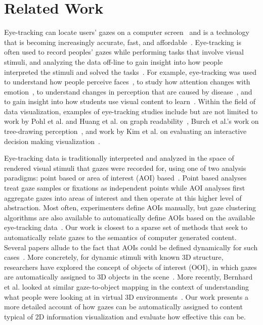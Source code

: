 \section{Related Work}
Eye-tracking can locate users' gazes on a computer screen~\cite{ware1987evaluation, jacob1991use} and is a technology that is becoming increasingly accurate, fast, and affordable~\cite{duchowski2007eye, sesma2012evaluation}. Eye-tracking is often used to record peoples' gazes while performing tasks that involve visual stimuli, and analyzing the data off-line to gain insight into how people interpreted the stimuli and solved the tasks~\cite{duchowski2007eye}. For example, eye-tracking was used to understand how people perceive faces~\cite{guo2014perceiving,shasteen2014eye}, to study how attention changes with emotion~\cite{vervoort2013attentional}, to understand changes in perception that are caused by disease~\cite{kim2014investigating}, and to gain insight into how students use visual content to learn~\cite{zawoyski2014using,mayer2010unique,van2010eye,conati2013eye}. Within the field of data visualization, examples of eye-tracking studies include but are not limited to work by Pohl et al. and Huang et al. on graph readability~\cite{pohl2009comparing,huang2008beyond,huang2005people}, Burch et al.'s work on tree-drawing perception~\cite{burch2011evaluation,burch2013visual}, and work by Kim et al. on evaluating an interactive decision making visualization~\cite{kim2012does}.
 
Eye-tracking data is traditionally interpreted and analyzed in the space of rendered visual stimuli that gazes were recorded for, using one of two analysis paradigms: point based or area of interest (AOI) based~\cite{blascheckstate}. Point based analyses treat gaze samples or fixations as independent points while AOI analyses first aggregate gazes into areas of interest and then operate at this higher level of abstraction. Most often, experimenters define AOIs manually, but gaze clustering algorithms are also available to automatically define AOIs based on the available eye-tracking data~\cite{privitera2000algorithms,santella2004robust,drusch2014analysing}. 
Our work is closest to a sparse set of methods that seek to automatically relate gazes to the semantics of computer generated content. Several papers allude to the fact that AOIs could be defined dynamically for such cases~\cite{steichen2013user,kurzhals2014iseecube}. More concretely, for dynamic stimuli with known 3D structure, researchers have explored the concept of objects of interest (OOI), in which gazes are automatically assigned to 3D objects in the scene~\cite{stellmach20103d}. More recently, Bernhard et al. looked at similar gaze-to-object mapping in the context of understanding what people were looking at in virtual 3D environments~\cite{bernhard2014gaze}. Our work presents a more detailed account of how gazes can be automatically assigned to content typical of 2D information visualization and evaluate how effective this can be.
 
